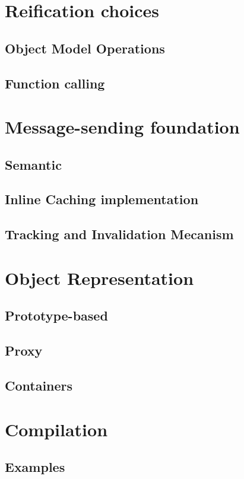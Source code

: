 \section{Reification choices}
\subsection{Object Model Operations}
\subsection{Function calling}

\section{Message-sending foundation}
\subsection{Semantic}
\subsection{Inline Caching implementation}
\subsection{Tracking and Invalidation Mecanism}

\section{Object Representation}
\subsection{Prototype-based}
\subsection{Proxy}
\subsection{Containers}


\section{Compilation}
\subsection{Examples}

